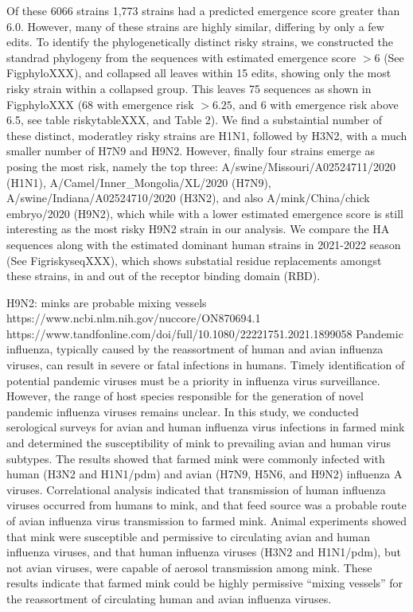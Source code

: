 \documentclass[onecolumn, compsoc,10pt]{IEEEtran}
\begin{document}
Of these 6066 strains 1,773 strains had a predicted emergence score greater than 6.0. However, many of these strains are highly similar, differing by only a few edits. To identify the phylogenetically distinct risky strains, we constructed the standrad phylogeny from the sequences with estimated emergence score $>6$ (See FigphyloXXX), and collapsed all leaves within 15 edits, showing only the most risky strain within a collapsed group. This leaves 75 sequences as shown in FigphyloXXX (68 with emergence risk $>6.25$, and 6 with emergence risk above 6.5, see table riskytableXXX, and Table 2). We find a substaintial number of these distinct, moderatley risky strains are H1N1, followed by H3N2, with a much smaller number of H7N9 and H9N2. However, finally four strains emerge as posing the most risk, namely the top three: 
A/swine/Missouri/A02524711/2020 (H1N1), A/Camel/Inner\_Mongolia/XL/2020 (H7N9), A/swine/Indiana/A02524710/2020 (H3N2), and also A/mink/China/chick embryo/2020 (H9N2), which while with a lower estimated emergence score is still interesting as the most risky H9N2 strain in our analysis. We compare the HA sequences along with the estimated dominant human strains in 2021-2022 season (See FigriskyseqXXX), which shows substatial residue replacements amongst these strains, in and out of the receptor binding domain (RBD). 

H9N2: minks are probable mixing vessels https://www.ncbi.nlm.nih.gov/nuccore/ON870694.1 https://www.tandfonline.com/doi/full/10.1080/22221751.2021.1899058 Pandemic influenza, typically caused by the reassortment of human and avian influenza viruses, can result in severe or fatal infections in humans. Timely identification of potential pandemic viruses must be a priority in influenza virus surveillance. However, the range of host species responsible for the generation of novel pandemic influenza viruses remains unclear. In this study, we conducted serological surveys for avian and human influenza virus infections in farmed mink and determined the susceptibility of mink to prevailing avian and human virus subtypes. The results showed that farmed mink were commonly infected with human (H3N2 and H1N1/pdm) and avian (H7N9, H5N6, and H9N2) influenza A viruses. Correlational analysis indicated that transmission of human influenza viruses occurred from humans to mink, and that feed source was a probable route of avian influenza virus transmission to farmed mink. Animal experiments showed that mink were susceptible and permissive to circulating avian and human influenza viruses, and that human influenza viruses (H3N2 and H1N1/pdm), but not avian viruses, were capable of aerosol transmission among mink. These results indicate that farmed mink could be highly permissive “mixing vessels” for the reassortment of circulating human and avian influenza viruses.
\end{document}
